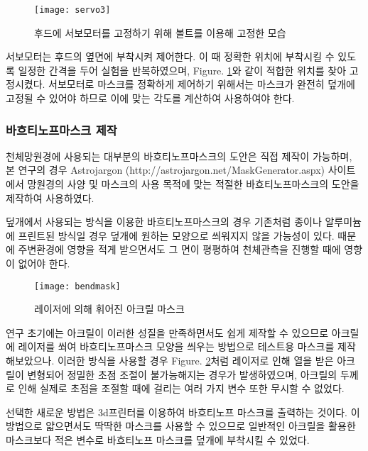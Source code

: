 \begin{figure}[ht]
	\begin{center}
		\texttt{[image: servo3]}
	\end{center}
	\caption{후드에 서보모터를 고정하기 위해 볼트를 이용해 고정한 모습}
	\label{servo}
\end{figure}


서보모터는 후드의 옆면에 부착시켜 제어한다. 이 때 정확한 위치에 부착시킬 수 있도록 일정한 간격을 두어 실험을 반복하였으며, \textrm{Figure}. \ref{servo}와 같이 적합한 위치를 찾아 고정시켰다. 서보모터로 마스크를 정확하게 제어하기 위해서는 마스크가 완전히 덮개에 고정될 수 있어야 하므로 이에 맞는 각도를 계산하여 사용하여야 한다.

\newpage
\subsubsection{바흐티노프마스크 제작}
천체망원경에 사용되는 대부분의 바흐티노프마스크의 도안은 직접 제작이 가능하며, 본 연구의 경우 Astrojargon (http://astrojargon.net/MaskGenerator.aspx) 사이트에서 망원경의 사양 및 마스크의 사용 목적에 맞는 적절한 바흐티노프마스크의 도안을 제작하여 사용하였다.

덮개에서 사용되는 방식을 이용한 바흐티노프마스크의 경우 기존처럼 종이나 알루미늄에 프린트된 방식일 경우 덮개에 원하는 모양으로 씌워지지 않을 가능성이 있다. 때문에 주변환경에 영향을 적게 받으면서도 그 면이 평평하여 천체관측을 진행할 때에 영향이 없어야 한다. 

\begin{figure}[h]
	\begin{center}
		\texttt{[image: bendmask]}
	\end{center}
	\caption{레이저에 의해 휘어진 아크릴 마스크}
	\label{bendmask}
\end{figure}


연구 초기에는 아크릴이 이러한 성질을 만족하면서도 쉽게 제작할 수 있으므로 아크릴에 레이저를 쐬여 바흐티노프마스크 모양을 씌우는 방법으로 테스트용 마스크를 제작해보았으나. 이러한 방식을 사용할 경우 \textrm{Figure}. \ref{bendmask}처럼 레이저로 인해 열을 받은 아크릴이 변형되어 정밀한 초점 조절이 불가능해지는 경우가 발생하였으며, 아크릴의 두께로 인해 실제로 초점을 조절할 때에 걸리는 여러 가지 변수 또한 무시할 수 없었다.

선택한 새로운 방법은 3d프린터를 이용하여 바흐티노프 마스크를 출력하는 것이다. 이 방법으로 얇으면서도 딱딱한 마스크를 사용할 수 있으므로 일반적인 아크릴을 활용한 마스크보다 적은 변수로 바흐티노프 마스크를 덮개에 부착시킬 수 있었다.

